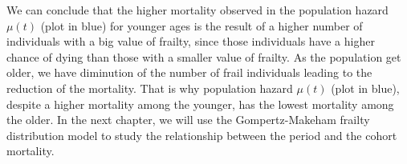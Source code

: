 We can conclude that the higher mortality observed in the population hazard $\mu(t)$ (plot in blue) for younger ages is the result of a higher number of individuals with a big value of frailty, since those individuals have a higher chance of dying than those with a smaller value of frailty. As the population get older, we have diminution of the number of frail individuals leading to the reduction of the mortality. That is why population hazard $\mu(t)$ (plot in blue), despite a higher mortality among the younger, has the lowest mortality among the older. 
In the next chapter, we will use the Gompertz-Makeham frailty distribution model to study the relationship between the period and the cohort mortality.


  
  
  
  
  
  




